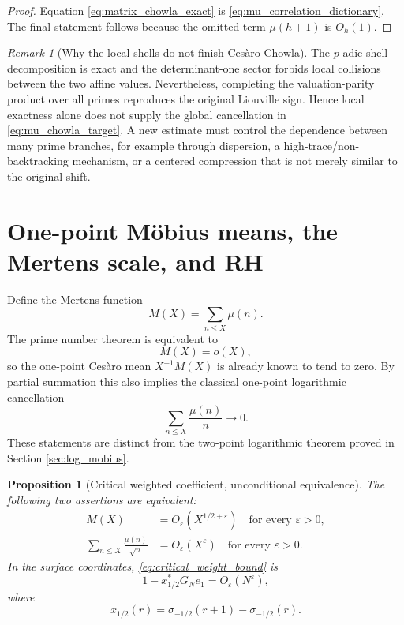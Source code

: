 \documentclass[11pt]{amsart}
\numberwithin{equation}{section}
\theoremstyle{plain}
\newtheorem{proposition}[theorem]{Proposition}
\theoremstyle{definition}
\theoremstyle{remark}
\newtheorem{remark}[theorem]{Remark}
\newcommand{\eps}{\varepsilon}
\newcommand{\mob}{\mu}
\begin{document}
\begin{proof}
Equation \eqref{eq:matrix_chowla_exact} is \eqref{eq:mu_correlation_dictionary}.  The final statement follows because the omitted term $\mob(h+1)$ is $O_h(1)$.
\end{proof}

\begin{remark}[Why the local shells do not finish Cesàro Chowla]
\label{rem:local_not_global}
The $p$-adic shell decomposition is exact and the determinant-one sector forbids local collisions between the two affine values.  Nevertheless, completing the valuation-parity product over all primes reproduces the original Liouville sign.  Hence local exactness alone does not supply the global cancellation in \eqref{eq:mu_chowla_target}.  A new estimate must control the dependence between many prime branches, for example through dispersion, a high-trace/non-backtracking mechanism, or a centered compression that is not merely similar to the original shift.
\end{remark}

\section{One-point Möbius means, the Mertens scale, and RH}
\label{sec:mertens_rh}

Define the Mertens function
\begin{equation}
M(X)=\sum_{n\le X}\mob(n).
\label{eq:Mertens_definition}
\end{equation}
The prime number theorem is equivalent to
\begin{equation}
M(X)=o(X),
\label{eq:PNT_Mertens}
\end{equation}
so the one-point Cesàro mean $X^{-1}M(X)$ is already known to tend to zero.  By partial summation this also implies the classical one-point logarithmic cancellation
\begin{equation}
\sum_{n\le X}\frac{\mob(n)}n\longrightarrow0.
\label{eq:one_point_log_mu}
\end{equation}
These statements are distinct from the two-point logarithmic theorem proved in Section \ref{sec:log_mobius}.

\begin{proposition}[Critical weighted coefficient, unconditional equivalence]
\label{prop:critical_weight_RH}
The following two assertions are equivalent:
\begin{align}
M(X)&=O_\eps(X^{1/2+\eps})\quad\text{for every }\eps>0,
\label{eq:Mertens_RH_scale}\\
\sum_{n\le X}\frac{\mob(n)}{\sqrt n}
&=O_\eps(X^\eps)\quad\text{for every }\eps>0.
\label{eq:critical_weight_bound}
\end{align}
In the surface coordinates, \eqref{eq:critical_weight_bound} is
\begin{equation}
1-x_{1/2}^*G_Ne_1=O_\eps(N^\eps),
\label{eq:critical_matrix_coefficient}
\end{equation}
where
\begin{equation}
x_{1/2}(r)=\sigma_{-1/2}(r+1)-\sigma_{-1/2}(r).
\label{eq:x_half}
\end{equation}
\end{proposition}
\end{document}
